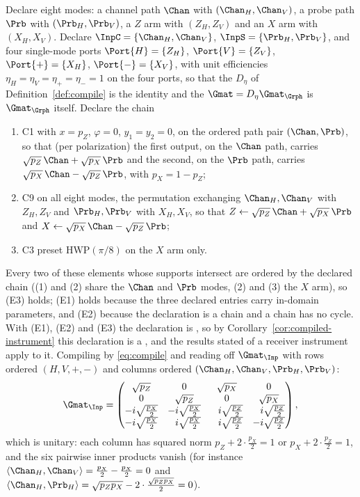 \begin{example}\label{ex:bb84}
Declare eight modes: a channel path $\Chan$ with $(\Chan_H,\Chan_V)$, a probe
path $\Prb$ with $(\Prb_H,\Prb_V)$, a $Z$ arm with $(Z_H,Z_V)$ and an $X$ arm
with $(X_H,X_V)$. Declare $\InpC=\{\Chan_H,\Chan_V\}$,
$\InpS=\{\Prb_H,\Prb_V\}$, and four single-mode ports
$\Port{H}=\{Z_H\}$, $\Port{V}=\{Z_V\}$, $\Port{+}=\{X_H\}$,
$\Port{-}=\{X_V\}$, with unit efficiencies
$\eta_H=\eta_V=\eta_+=\eta_-=1$ on the four ports, so that the
 $D_\eta$ of Definition~\ref{def:compile} is the
identity and the 
$\Gmat=D_\eta\Gmat_\Grph$ is $\Gmat_\Grph$ itself. Declare the chain
\begin{enumerate}[label=(\arabic*),leftmargin=2.2em]
\item C1 with $x=p_Z$, $\varphi=0$, $y_1=y_2=0$, on the ordered path pair
  $(\Chan,\Prb)$, so that (per polarization) the first output, on the
  $\Chan$ path, carries $\sqrt{p_Z}\,\Chan+\sqrt{p_X}\,\Prb$ and the second,
  on the $\Prb$ path, carries $\sqrt{p_X}\,\Chan-\sqrt{p_Z}\,\Prb$, with
  $p_X=1-p_Z$;
\item C9 on all eight modes, the permutation exchanging $\Chan_H,\Chan_V$
  with $Z_H,Z_V$ and $\Prb_H,\Prb_V$ with $X_H,X_V$, so that
  $Z\leftarrow\sqrt{p_Z}\,\Chan+\sqrt{p_X}\,\Prb$ and
  $X\leftarrow\sqrt{p_X}\,\Chan-\sqrt{p_Z}\,\Prb$;
\item C3 preset $\mathrm{HWP}(\pi/8)$ on the $X$ arm only.
\end{enumerate}
Every two of these elements whose supports intersect are ordered by the
declared chain ((1) and (2) share the $\Chan$ and $\Prb$ modes, (2) and (3)
the $X$ arm), so (E3) holds; (E1) holds because the three declared
entries carry in-domain parameters, and (E2) because the declaration is a
chain and a chain has no cycle. With (E1), (E2) and (E3) the declaration is
, so by Corollary~\ref{cor:compiled-instrument} this declaration is
a , and the results stated of a receiver
instrument apply to it. Compiling by \eqref{eq:compile} and reading
off $\Gmat_{\Inp}$ with rows ordered $(H,V,+,-)$ and columns ordered
$(\Chan_H,\Chan_V,\Prb_H,\Prb_V)$:
\begin{equation}\label{eq:bb84G}
  \Gmat_{\Inp}=
  \begin{pmatrix}
    \sqrt{p_Z} & 0 & \sqrt{p_X} & 0\\
    0 & \sqrt{p_Z} & 0 & \sqrt{p_X}\\
    -i\sqrt{\tfrac{p_X}{2}} & -i\sqrt{\tfrac{p_X}{2}} &
      \phantom{-}i\sqrt{\tfrac{p_Z}{2}} & \phantom{-}i\sqrt{\tfrac{p_Z}{2}}\\
    -i\sqrt{\tfrac{p_X}{2}} & \phantom{-}i\sqrt{\tfrac{p_X}{2}} &
      \phantom{-}i\sqrt{\tfrac{p_Z}{2}} & -i\sqrt{\tfrac{p_Z}{2}}
  \end{pmatrix},
\end{equation}
which is unitary: each column has squared norm $p_Z+2\cdot\frac{p_X}{2}=1$ or
$p_X+2\cdot\frac{p_Z}{2}=1$, and the six pairwise inner products vanish
(for instance
$\langle\Chan_H,\Chan_V\rangle=\frac{p_X}{2}-\frac{p_X}{2}=0$ and
$\langle\Chan_H,\Prb_H\rangle=\sqrt{p_Zp_X}-2\cdot\frac{\sqrt{p_Zp_X}}{2}=0$).


\end{example}
